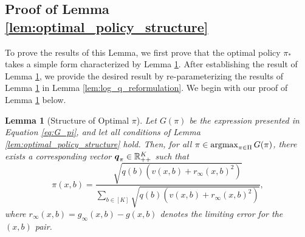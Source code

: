 \documentclass{article}
\newtheorem{lemma}{Lemma}
\begin{document}
\begin{appendices}
\subsection{Proof of Lemma \ref{lem:optimal_policy_structure}}

To prove the results of this Lemma, we first prove that the optimal policy $\pi_*$ takes a simple form characterized by Lemma \ref{lem:optimal_pi_reduction}. After establishing the result of Lemma \ref{lem:optimal_pi_reduction}, we provide the desired result by re-parameterizing the results of Lemma \ref{lem:optimal_pi_reduction} in Lemma \ref{lem:log_q_reformulation}. We begin with our proof of Lemma \ref{lem:optimal_pi_reduction} below. 

\begin{lemma}[Structure of Optimal $\pi$]\label{lem:optimal_pi_reduction}
    Let $G(\pi)$ be the expression presented in Equation \eqref{eq:G_pi}, and let all conditions of Lemma \ref{lem:optimal_policy_structure} hold. Then, for all $\pi \in \argmax_{\pi \in \Pi} G(\pi)$, there exists a corresponding vector $\boldsymbol{q}_\pi \in \mathbb{R}^K_{++}$ such that 
    \begin{equation}
        \pi(x,b) = \frac{\sqrt{q(b) (v(x,b) + r_\infty(x,b)^2)}}{\sum_{b \in [K]}\sqrt{q(b) (v(x,b)+ r_\infty(x,b)^2)}},
    \end{equation}
    where $r_\infty(x,b) = g_\infty(x,b) - g(x,b)$ denotes the limiting error for the $(x,b)$ pair. 
\end{lemma}



\end{appendices}
\end{document}
